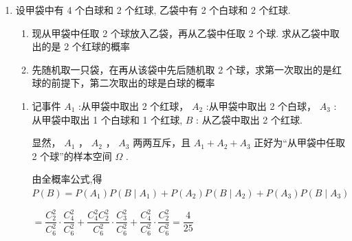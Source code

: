 \begin{enumerate}
\begin{enumerate}
\begin{jieda}
\begin{enumerate}
                $P\left( B\right)  = P\left( {A}_{1}\right) P\left( {B \mid  {A}_{1}}\right)  + P\left( {A}_{2}\right) P\left( {B \mid  {A}_{2}}\right)  + P\left( {A}_{3}\right) P\left( {B \mid  {A}_{3}}\right)  + P\left( {A}_{4}\right) P\left( {B \mid  {A}_{4}}\right) = {0.2} \times  {0.6} + {0.3} \times  {0.8} + {0.3} \times  {0.7} + {0.2} \times  {0.7} = {0.71}.$
                
                \item $P\left( {{A}_{4} \mid  B}\right)  = \dfrac{P\left( {{A}_{4}B}\right) }{P\left( B\right) } = \dfrac{P\left( {A}_{4}\right) P\left( {B \mid  {A}_{4}}\right) }{P\left( B\right) } = \dfrac{{0.2} \times  {0.7}}{0.71} = \dfrac{14}{71}$
            \end{enumerate}
        \end{jieda}
        \item 设甲袋中有 4 个白球和 2 个红球, 乙袋中有 2 个白球和 2 个红球.
        \begin{enumerate}
            \item 现从甲袋中任取 2 个球放入乙袋，再从乙袋中任取 2 个球. 求从乙袋中取出的是 2 个红球的概率
            \item 先随机取一只袋，在再从该袋中先后随机取 2 个球，求第一次取出的是红球的前提下，第二次取出的球是白球的概率
        \end{enumerate}
        \begin{jieda}
            \begin{enumerate}
                \item 记事件 ${A}_1$ :从甲袋中取出 2 个红球， ${A}_{2}$ :从甲袋中取出 2 个白球， ${A}_{3}$ :从甲袋中取出 1 个白球和 1 个红球, $B$ : 从乙袋中取出 2 个红球.
                
                显然， ${A}_{1}$ ， ${A}_{2}$ ， ${A}_{3}$ 两两互斥，且 ${A}_{1} + {A}_{2} + {A}_{3}$ 正好为“从甲袋中任取 2 个球”的样本空间 $\Omega$ .
                
                由全概率公式,得 $P\left( B\right)  = P\left( {A}_{1}\right) P\left( {B \mid  {A}_{1}}\right)  + P\left( {A}_{2}\right) P\left( {B \mid  {A}_{2}}\right)  + P\left( {A}_{3}\right) P\left( {B \mid  {A}_{3}}\right)$
                
                $= \dfrac{{{C}}_{2}^{2}}{{{C}}_{6}^{2}} \cdot  \dfrac{{{C}}_{4}^{2}}{{{C}}_{6}^{2}} + \dfrac{{{C}}_{4}^{2}{{C}}_{2}^{2}}{{{C}}_{6}^{2}} \cdot  \dfrac{{{C}}_{3}^{2}}{{{C}}_{6}^{2}} + \dfrac{{{C}}_{4}^{2}}{{{C}}_{6}^{2}} \cdot  \dfrac{{{C}}_{2}^{2}}{{{C}}_{6}^{2}} = \dfrac{4}{25}$


\end{enumerate}
\end{jieda}
\end{enumerate}
\end{enumerate}
